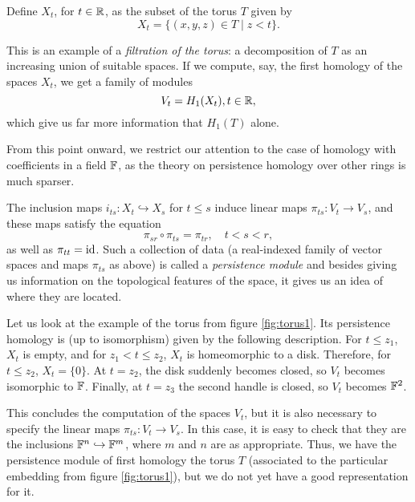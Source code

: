 Define $X_t$, for $t \in \mathbb{R}$, as the subset of the torus $T$ given by
\begin{equation}
X_t = \{ (x,y,z) \in T \mid z < t \}.
\end{equation}

This is an example of a \emph{filtration of the torus}: a decomposition of $T$ as an increasing union of suitable spaces. If we compute, say, the first homology of the spaces $X_t$, we get a family of modules
\begin{equation}
V_t = H_1(X_t), t \in \mathbb{R},
\end{equation}
which give us far more information that $H_1(T)$ alone.

From this point onward, we restrict our attention to the case of homology with coefficients in a field $\mathbb{F}$, as the theory on persistence homology over other rings is much sparser.

The inclusion maps $i_{ts} \colon X_t \hookrightarrow X_s$ for $t \leq s$ induce linear maps $\pi_{ts} \colon V_t \to V_s$, and these maps satisfy the equation
\begin{equation}
\pi_{sr} \circ \pi_{ts} = \pi_{tr}, \quad t < s < r,
\end{equation}
as well as $\pi_{tt} = \mathrm{id}$. Such a collection of data (a real-indexed family of vector spaces and maps $\pi_{ts}$ as above) is called a \emph{persistence module} and besides giving us information on the topological features of the space, it gives us an idea of where they are located.

Let us look at the example of the torus from figure \ref{fig:torus1}. Its persistence homology is (up to isomorphism) given by the following description. For $t \leq z_1$, $X_t$ is empty, and for $z_1 < t \leq z_2$, $X_t$ is homeomorphic to a disk. Therefore, for $t \leq z_2$, $X_t = \{0\}$. At $t = z_2$, the disk suddenly becomes closed, so $V_t$ becomes isomorphic to $\mathbb{F}$. Finally, at $t = z_3$ the second handle is closed, so $V_t$ becomes $\mathbb{F}^2$.

This concludes the computation of the spaces $V_t$, but it is also necessary to specify the linear maps $\pi_{ts} \colon V_t \to V_s$. In this case, it is easy to check that they are the inclusions $\mathbb{F}^n \hookrightarrow \mathbb{F}^m$, where $m$ and $n$ are as appropriate. Thus, we have the persistence module of first homology the torus $T$ (associated to the particular embedding from figure \ref{fig:torus1}), but we do not yet have a good representation for it.

